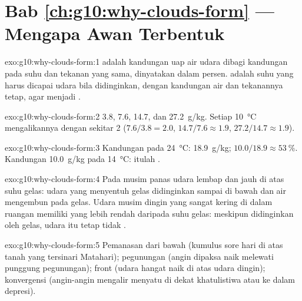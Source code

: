 \section*{Bab \ref{ch:g10:why-clouds-form} --- Mengapa Awan Terbentuk}

\begin{solution}{exo:g10:why-clouds-form:1}
 adalah kandungan uap air udara dibagi kandungan 
pada suhu dan tekanan yang sama, dinyatakan dalam persen.  adalah
suhu yang harus dicapai udara bila didinginkan, dengan kandungan air dan
tekanannya tetap, agar menjadi .
\end{solution}

\begin{solution}{exo:g10:why-clouds-form:2}
\num{3.8}, \num{7.6}, \num{14.7}, dan \qty{27.2}{g/kg}. Setiap
\qty{10}{\degreeCelsius} mengalikannya dengan sekitar 2 ($7.6/3.8 = 2.0$,
$14.7/7.6 \approx 1.9$, $27.2/14.7 \approx 1.9$).
\end{solution}

\begin{solution}{exo:g10:why-clouds-form:3}
Kandungan  pada \qty{24}{\degreeCelsius}: \qty{18.9}{g/kg};  $10.0/18.9 \approx \qty{53}{\percent}$. Kandungan 
\qty{10.0}{g/kg} pada \qty{14}{\degreeCelsius}: itulah .
\end{solution}

\begin{solution}{exo:g10:why-clouds-form:4}
Pada musim panas udara lembap dan  jauh di atas suhu gelas:
udara yang menyentuh gelas didinginkan sampai di bawah  dan air
mengembun pada gelas. Udara musim dingin yang sangat kering di dalam ruangan
memiliki  yang lebih rendah daripada suhu gelas: meskipun
didinginkan oleh gelas, udara itu tetap tidak .
\end{solution}

\begin{solution}{exo:g10:why-clouds-form:5}
Pemanasan dari bawah (kumulus sore hari di atas tanah yang tersinari
Matahari); pegunungan (angin dipaksa naik melewati punggung pegunungan); front
(udara hangat naik di atas udara dingin); konvergensi (angin-angin mengalir
menyatu di dekat khatulistiwa atau ke dalam depresi).
\end{solution}

